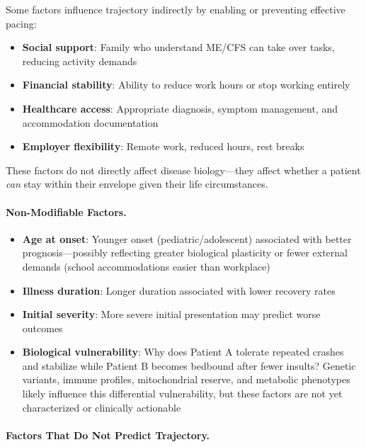 Some factors influence trajectory indirectly by enabling or preventing effective pacing:

\begin{itemize}
    \item \textbf{Social support}: Family who understand ME/CFS can take over tasks, reducing activity demands
    \item \textbf{Financial stability}: Ability to reduce work hours or stop working entirely
    \item \textbf{Healthcare access}: Appropriate diagnosis, symptom management, and accommodation documentation
    \item \textbf{Employer flexibility}: Remote work, reduced hours, rest breaks
\end{itemize}

These factors do not directly affect disease biology---they affect whether a patient \emph{can} stay within their envelope given their life circumstances.

\paragraph{Non-Modifiable Factors.}

\begin{itemize}
    \item \textbf{Age at onset}: Younger onset (pediatric/adolescent) associated with better prognosis---possibly reflecting greater biological plasticity or fewer external demands (school accommodations easier than workplace)
    \item \textbf{Illness duration}: Longer duration associated with lower recovery rates
    \item \textbf{Initial severity}: More severe initial presentation may predict worse outcomes
    \item \textbf{Biological vulnerability}: Why does Patient A tolerate repeated crashes and stabilize while Patient B becomes bedbound after fewer insults? Genetic variants, immune profiles, mitochondrial reserve, and metabolic phenotypes likely influence this differential vulnerability, but these factors are not yet characterized or clinically actionable
\end{itemize}

\paragraph{Factors That Do Not Predict Trajectory.}

